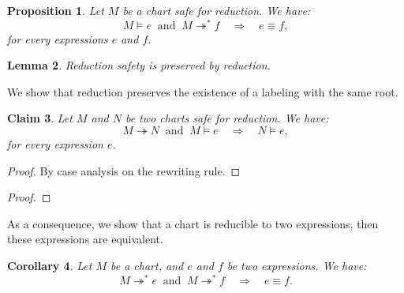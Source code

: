 \documentclass{article}
\newtheorem{definition}{Definition}[section]
\newtheorem{lemma}[definition]{Lemma}
\newtheorem{proposition}[definition]{Proposition}
\newtheorem{claim}[definition]{Claim}
\newtheorem{corollary}[definition]{Corollary}
\begin{document}
\begin{proposition} Let $M$ be a chart safe for reduction. We have:
  $$ M \models e\ \text{ and }\  M\twoheadrightarrow^* f\quad \Longrightarrow\quad e\equiv f,$$ for every expressions $e$ and $f$.
\end{proposition}
 \begin{lemma} Reduction safety is preserved by reduction.\end{lemma}
We show that reduction preserves the existence of a labeling with the same root.
  \begin{claim} Let $M$ and $N$ be two charts safe for reduction. We have:
    $$ M \twoheadrightarrow N \ \text{ and }\ M \models e \quad \Longrightarrow\quad N \models e,$$ for every expression $e$.
  \end{claim}
\begin{proof}
  By case analysis on the rewriting rule.
\end{proof}
\begin{proof} 


\end{proof}

As a consequence, we show that a chart is reducible to two expressions, then these expressions are equivalent.
\begin{corollary} Let $M$ be a chart, and $e$ and $f$ be two expressions. We have:
  $$ M \twoheadrightarrow^* e\ \text{ and }\  M\twoheadrightarrow^* f\quad \Longrightarrow\quad e\equiv f.$$\label{cor:confluence}
\end{corollary}


\end{document}
